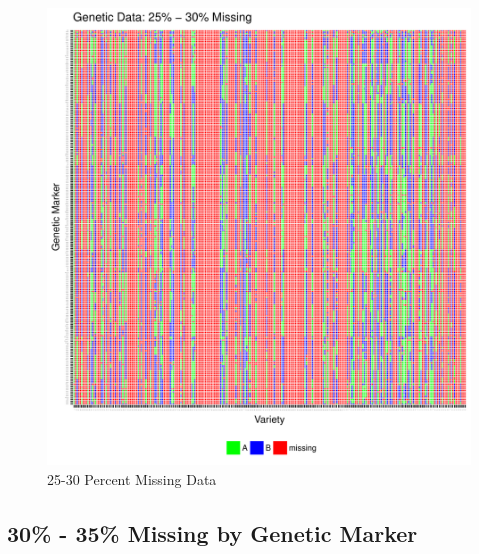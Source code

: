 \documentclass[11pt]{article}\usepackage[]{graphicx}\usepackage[]{color}
\makeatletter
\def\maxwidth{ %
  \ifdim\Gin@nat@width>\linewidth
    \linewidth
  \else
    \Gin@nat@width
  \fi
}
\newenvironment{knitrout}{}{} %
\makeatother
\begin{document}
\begin{knitrout}\footnotesize
{}\color{fgcolor}\begin{figure}[H]

{\centering \includegraphics[width=\maxwidth]{figure/missing_plot30-1} 

}

\caption[25-30 Percent Missing Data]{25-30 Percent Missing Data}\label{fig:missing.plot30}
\end{figure}


\end{knitrout}

\newpage


\subsection{30\% - 35\% Missing by Genetic Marker}
\end{document}
